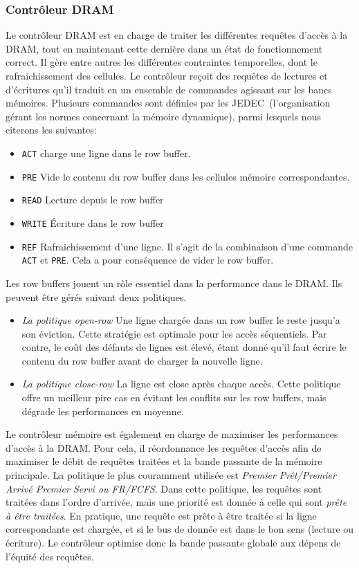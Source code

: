 \subsubsection{Contrôleur DRAM}

Le contrôleur DRAM est en charge de traiter les différentes requêtes d'accès à la DRAM, tout en maintenant cette dernière dans un état de fonctionnement correct.
Il gère entre autres les différentes contraintes temporelles, dont le rafraichissement des cellules.
Le contrôleur reçoit des requêtes de lectures et d'écritures qu'il traduit en un ensemble de commandes agissant sur les bancs mémoires.
Plusieurs commandes sont définies par les JEDEC~\cite{specification2010jesd79}(l'organisation gérant les normes concernant la mémoire dynamique), parmi lesquels nous citerons les suivantes:

\begin{itemize}
	\item \texttt{ACT} charge une ligne dans le row buffer.
	\item \texttt{PRE} Vide le contenu du row buffer dans les cellules mémoire correspondantes.
	\item \texttt{READ} Lecture depuis le row buffer
	\item \texttt{WRITE} Écriture dans le row buffer
	\item \texttt{REF} Rafraichissement d'une ligne.
	Il s'agit de la combinaison d'une commande \texttt{ACT} et \texttt{PRE}.
	Cela a pour conséquence de vider le row buffer.
\end{itemize}

Les row buffers jouent un rôle essentiel dans la performance dans le DRAM.
Ils peuvent être gérés suivant deux politiques.
\begin{itemize}
	\item \emph{La politique open-row} Une ligne chargée dans un row buffer le reste jusqu'a son éviction.
	Cette stratégie est optimale pour les accès séquentiels.
	Par contre, le coût des défauts de lignes est élevé, étant donné qu'il faut écrire le contenu du row buffer avant de charger la nouvelle ligne.

	\item \emph{La politique close-row} La ligne est close après chaque accès.
	Cette politique offre un meilleur pire cas en évitant les conflits sur les row buffers, mais dégrade les performances en moyenne.
\end{itemize}

Le contrôleur mémoire est également en charge de maximiser les performances d'accès à la DRAM.
Pour cela, il réordonnance les requêtes d'accès afin de maximiser le débit de requêtes traitées et la bande passante de la mémoire principale.
La politique le plus couramment utilisée est \emph{Premier Prêt/Premier Arrivé Premier Servi ou FR/FCFS}.
Dans cette politique, les requêtes sont traitées dans l'ordre d'arrivée, mais une priorité est donnée à celle qui sont \emph{prête à être traitées}.
En pratique, une requête est prête à être traitée si la ligne correspondante est chargée, et si le bus de donnée est dans le bon sens (lecture ou écriture).
Le contrôleur optimise donc la bande passante globale aux dépens de l'équité des requêtes.

